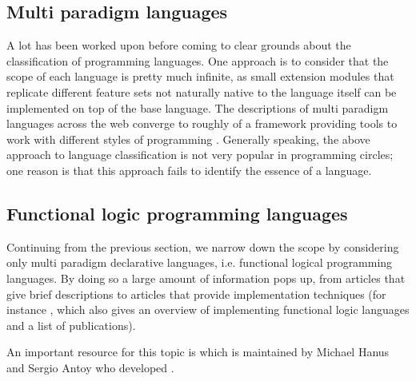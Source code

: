 \documentclass[thesis-solanki.tex]{subfiles}
\begin{document}
\subsection{Multi paradigm languages}

A lot has been worked upon before coming to clear grounds about the classification of programming languages.
One approach is to consider that the scope of each language is pretty much infinite, as small extension modules that
replicate different feature sets not naturally native to the language itself can be implemented on top of
the base language.
The descriptions of multi paradigm languages across the web
\cite{website:wikimultiparadigm,website:mdn,website:blogc2} converge to roughly of a framework providing tools to work with different 
styles of programming \cite{website:wikimpllist,website:dmoz}.
Generally speaking, the above approach to language classification
is not very popular in programming circles; one reason is that this approach fails to identify the essence of a language.

\subsection{Functional logic programming languages}

Continuing from the previous section, we narrow down the scope by considering only multi paradigm declarative
languages, i.e. functional logical programming languages.
By doing so a large amount of information pops up, from articles that give brief descriptions
\cite{website:wikiflpl, website:wikiflpllist} to articles that provide implementation techniques (for instance
\cite{website:imlpementingflpl}, which also gives an overview of implementing functional logic languages and a list of publications).

\begin{comment}

The important piece however is the fact that there is a dedicated website \cite{website:funclogprog} for the history,
research and development, existing languages, the literature, the contacts and everything else that one can think
of for functional logic languages.
\end{comment}
An important resource for this topic is \cite{website:funclogprog} which is maintained by Michael Hanus \cite{website:mhanus} 
and Sergio Antoy \cite{website:santoy} who developed  \cite{hanus1995curry}.

\begin{comment}
As a matter of fact the holy grail of information is maintained by two of the most important people in the field
Michael Hanus \cite{website:mhanus} and Sergio Antoy \cite{website:santoy}.
\end{comment}
\end{document}
